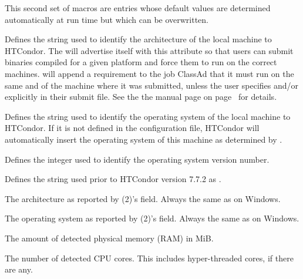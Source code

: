 This second set of macros are entries whose default values are
determined automatically at run time but which can be overwritten.  
\begin{description}

\label{param:Arch}
\item[\MacroU{ARCH}]
  Defines the string
  used to identify the architecture of the local machine to HTCondor.
  The  will advertise itself with this attribute so
  that users can submit binaries compiled for a given platform and
  force them to run on the correct machines.   will
  append a requirement to the job ClassAd that it must
  run on the same  and  of the machine where
  it was submitted, unless the user specifies  and/or
   explicitly in their submit file.  See the
  the  manual page
  on page~\pageref{man-condor-submit} for details.

\label{param:OpSys}
\item[\MacroU{OPSYS}]
  Defines the string used to identify the operating system
  of the local machine to HTCondor.
  If it is not defined in the configuration file, HTCondor will
  automatically insert the operating system of this machine as
  determined by .

\label{param:OpSysVer}
\item[\MacroU{OPSYS\_VER}]
  Defines the integer used to identify the operating system version number.

\label{param:OpSysAndVer}
\item[\MacroU{OPSYS\_AND\_VER}]
  Defines the string used prior to HTCondor version 7.7.2 as .

\label{param:UnameArch}
\item[\MacroU{UNAME\_ARCH}]
  The architecture as reported by (2)'s  field.
  Always the same as  on Windows.

\label{param:UnameOpsys}
\item[\MacroU{UNAME\_OPSYS}]
  The operating system as reported by (2)'s  field.
  Always the same as  on Windows.

\label{param:DetectedMemory}
\item[\MacroU{DETECTED\_MEMORY}]
  The amount of detected physical memory (RAM) in MiB.

\label{param:DetectedCores}
\item[\MacroU{DETECTED\_CORES}]
  The number of detected CPU cores.  
  This includes hyper-threaded cores, if there are any.


\end{description}
